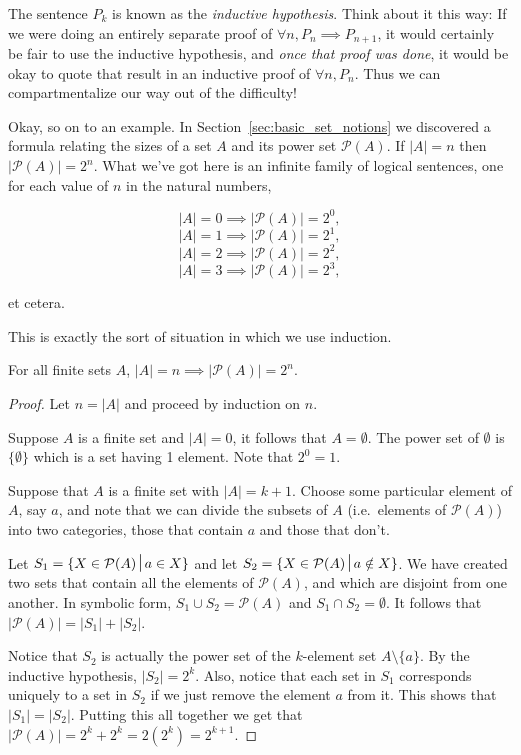 The sentence $P_k$ is known as the 
\emph{inductive hypothesis}.
Think about it this way:  If we were doing an entirely separate
proof of $\forall n,  P_n \implies P_{n+1}$, it would certainly be fair
to use the inductive hypothesis, and \emph{once that proof was done}, 
it would be okay to quote that result in an inductive proof of 
$\forall n,  P_n$.  Thus we can compartmentalize our way out of the
difficulty!

Okay, so on to an example.  In Section~\ref{sec:basic_set_notions} 
we discovered a formula relating the sizes of a set $A$ and its 
power set ${\mathcal P}(A)$.  If $|A| = n$ then $|{\mathcal P}(A)| = 2^n$.
What we've got here is an infinite family of logical sentences, one for 
each value of $n$ in the natural numbers,

\[ |A| = 0 \implies |{\mathcal P}(A)| = 2^0, \]
\[ |A| = 1 \implies |{\mathcal P}(A)| = 2^1, \]
\[ |A| = 2 \implies |{\mathcal P}(A)| = 2^2, \]
\[ |A| = 3 \implies |{\mathcal P}(A)| = 2^3, \]

\noindent et cetera.

This is exactly the sort of situation in which we use induction.

\begin{thm} For all finite sets $A$, $\displaystyle |A| = n \implies  |{\mathcal P}(A)| = 2^n$.
\end{thm}

\begin{proof}
Let $n = |A|$ and proceed by induction on $n$.

 Suppose $A$ is a finite set and $|A| = 0$, it follows 
that $A = \emptyset$.  The power set of $\emptyset$ is $\{ \emptyset \}$ 
which is a set having 1 element.  Note that $2^0 = 1$.
   
  Suppose that $A$ is a finite set with $|A| = k+1$.  Choose some particular element of $A$, say $a$, and note that
we can divide the subsets of $A$ (i.e.\ elements of ${\mathcal P}(A)$) into
two categories, those that contain $a$ and those that don't.

Let $S_1 = \{ X \in {\mathcal P}(A) \suchthat a \in X \}$ and let
$S_2 = \{ X \in {\mathcal P}(A) \suchthat a \notin X \}$.  We have 
created two sets that contain all the elements of ${\mathcal P}(A)$,
and which are disjoint from one another.  In symbolic form, 
$S_1 \cup S_2 = {\mathcal P}(A)$ and $S_1 \cap S_2 = \emptyset$.
It follows that $|{\mathcal P}(A)| = |S_1| + |S_2|$.  

Notice that $S_2$ is actually the power set of the $k$-element set
$A \setminus \{ a \}$.  By the inductive hypothesis, $|S_2| = 2^k$.
Also, notice that each set in $S_1$ corresponds uniquely to a set in
$S_2$ if we just remove the element $a$ from it.  This shows that 
$|S_1| = |S_2|$.  Putting this all together we get that 
$|{\mathcal P}(A)| = 2^k + 2^k = 2(2^k) = 2^{k+1}$.

\end{proof}

